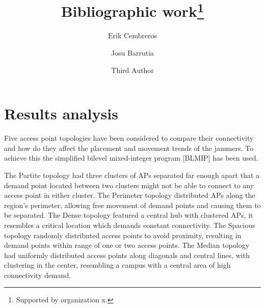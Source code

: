 \documentclass[runningheads]{llncs}
\begin{document}
	\title{Bibliographic work\thanks{Supported by organization x.}}
	\author{Erik Cembreros \and
		Josu Barrutia \and
		Third Author}
	\maketitle              %
	\begin{abstract}
			
		
	\end{abstract}
	
	\clearpage
	\section{Results analysis}
	
	Five access point topologies have been considered to compare their connectivity and how do they affect the placement and movement trends of the jammers. To achieve this the simplified bilevel mixed-integer program [BLMIP] has been used.
	
	The Partite topology had three clusters of APs separated far enough apart that a demand point located between two clusters might not be able to connect to any access point in either cluster. The Perimeter topology distributed APs along the region's perimeter, allowing free movement of demand points and causing them to be separated. The Dense topology featured a central hub with clustered APs, it resembles a critical location which demands constant connectivity. The Spacious topology randomly distributed access points to avoid proximity, resulting in demand points within range of one or two access points. The Median topology had uniformly distributed access points along diagonals and central lines, with clustering in the center, resembling a campus with a central area of high connectivity demand.
	
\end{document}
